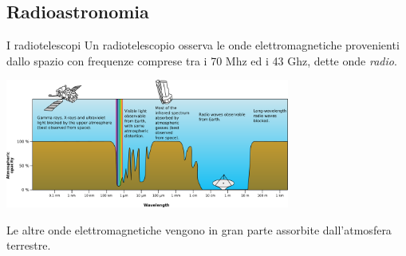\documentclass[red]{beamer}
\begin{document}
\subsection{Radioastronomia}
\begin{frame}{I radiotelescopi}
	Un radiotelescopio osserva le onde elettromagnetiche provenienti dallo spazio
	con frequenze comprese tra i 70 Mhz ed i 43 Ghz, dette onde
	\emph{radio}.
	\begin{center}
		\includegraphics[width=0.7\textwidth]{Atmospheric_electromagnetic_opacity}
	\end{center}
	Le altre onde elettromagnetiche vengono in gran parte assorbite dall'atmosfera
	terrestre.
\end{frame}
\end{document}
